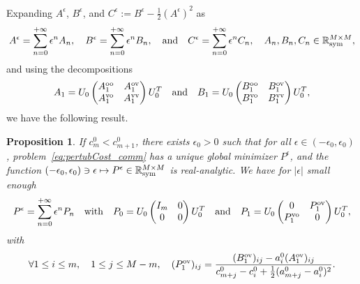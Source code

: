 \documentclass{article}
\def\R{\mathbb R}
\newtheorem{proposition}[theorem]{Proposition}
\newcommand{\1}{{\mathds 1}}
\begin{document}
Expanding $A^\epsilon$, $B^\epsilon$, and $C^\epsilon := B^\epsilon - \frac 12 (A^\epsilon)^2$ as
$$
A^\epsilon = \sum_{n=0}^{+\infty} \epsilon^n A_n, \quad B^\epsilon = \sum_{n=0}^{+\infty} \epsilon^n B_n, \quad \mbox{and} \quad C^\epsilon = \sum_{n=0}^{+\infty} \epsilon^n C_n, \quad A_n,B_n,C_n \in \R^{M \times M}_{\rm sym}, 
$$
and using the decompositions 
$$
A_1= U_0 \begin{pmatrix}
             A_1^{\rm oo} &  A_1^{\rm ov} \\ A_{1}^{\rm vo} & A_1^{\rm vv}
         \end{pmatrix} U_0^T \quad \mbox{and} \quad B_1= U_0 \begin{pmatrix}
             B_1^{\rm oo} &  B_1^{\rm ov} \\ B_{1}^{\rm vo} & B_1^{\rm vv}
         \end{pmatrix} U_0^T,
         $$
we have the following result.



\medskip

\begin{proposition} If $c_m^0 < c_{m+1}^0$, there exists $\epsilon_0 > 0$ such that for all $\epsilon \in (-\epsilon_0,\epsilon_0)$, problem~\eqref{eq:pertubCost_comm} has a unique global minimizer $P^\epsilon$, and the function $(-\epsilon_0,\epsilon_0) \ni \epsilon \mapsto P^\epsilon \in \R^{M \times M}_{\rm sym}$ is real-analytic. We have for $|\epsilon|$ small enough
\begin{equation} \label{eq:expantion_Pepsilon}
P^\epsilon = \sum_{n=0}^{+\infty} \epsilon^n P_n \quad \mbox{with} \quad P_0= U_0  \begin{pmatrix}
             I_m & 0 \\ 0 & 0
         \end{pmatrix} U_0^T \quad \mbox{and} \quad P_1=  U_0 \begin{pmatrix}
             0 & P_{1}^{\rm ov}\\ P_{1}^{\rm vo} & 0
         \end{pmatrix} U_0^T,
\end{equation}
with 
\begin{equation}\label{eq:P1ov}
\forall 1 \le i \le m, \quad 1 \le j \le M-m, \quad (P_{1}^{\rm ov})_{ij} = \frac{(B_{1}^{\rm ov})_{ij} - a^0_{i} (A_{1}^{\rm ov})_{ij}}{c_{m+j}^0-c_i^0 +\frac 12 (a_{m+j}^0-a_i^0)^2}.
\end{equation}
 \end{proposition}
 
\end{document}
